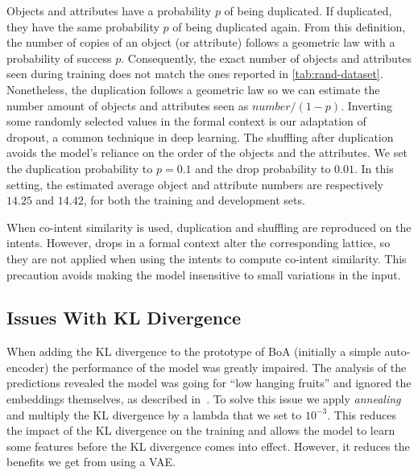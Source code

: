 Objects and attributes have a probability $p$ of being duplicated.
If duplicated, they have the same probability $p$ of being duplicated again.
From this definition, the number of copies of an object (or attribute) follows a geometric law with a probability of success $p$.
Consequently, the exact number of objects and attributes seen during training does not match the ones reported in \cref{tab:rand-dataset}.
Nonetheless, the duplication follows a geometric law so we can estimate the number amount of objects and attributes seen as $number/(1 - p)$.
Inverting some randomly selected values in the formal context is our adaptation of dropout, a common technique in deep learning.
The shuffling after duplication avoids the model's reliance on the order of the objects and the attributes.
We set the duplication probability to $p=0.1$ and the drop probability to $0.01$.
In this setting, the estimated average object and attribute numbers are respectively $14.25$ and $14.42$, for both the training and development sets.

When co-intent similarity is used, duplication and shuffling are reproduced on the intents.
However, drops in a formal context alter the corresponding lattice, so they are not applied when using the intents to compute co-intent similarity.
This precaution avoids making the model insensitive to small variations in the input.


\subsection{Issues With KL Divergence}\label{sec:kl-problem}
When adding the KL divergence to the prototype of BoA (initially a simple auto-encoder) the performance of the model was greatly impaired.
The analysis of the predictions revealed the model was going for ``low hanging fruits'' and ignored the embeddings themselves, as described in~\cite{annealing-kl:2015:bowman}.
To solve this issue we apply \textit{annealing}~\cite{annealing-kl:2015:bowman} and multiply the KL divergence by a lambda that we set to $10^{-3}$.
This reduces the impact of the KL divergence on the training and allows the model to learn some features before the KL divergence comes into effect.
However, it reduces the benefits we get from using a VAE.%

